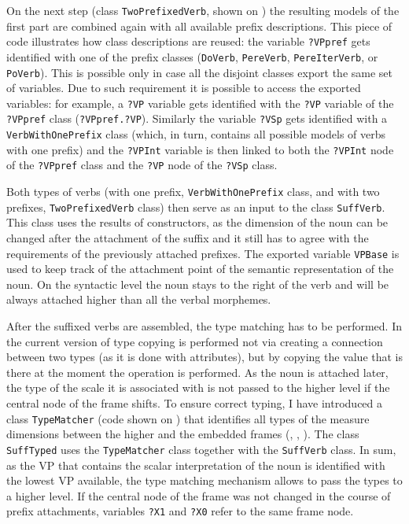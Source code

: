 On the next step (class \texttt{TwoPrefixedVerb}, shown on ) the resulting models of the first part are combined again with all available prefix descriptions. This piece of code illustrates how class descriptions are reused: the variable \texttt{?VPpref} gets identified with one of the prefix classes (\texttt{DoVerb}, \texttt{PereVerb}, \texttt{PereIterVerb}, or \texttt{PoVerb}). This is possible only in case all the disjoint classes export the same set of variables. Due to such requirement it is possible to access the exported variables: for example, a \texttt{?VP} variable gets identified with the \texttt{?VP} variable of the \texttt{?VPpref} class (\texttt{?VPpref.?VP}). Similarly the variable \texttt{?VSp} gets identified with a \texttt{VerbWithOnePrefix} class (which, in turn, contains all possible models of verbs with one prefix) and the \texttt{?VPInt} variable is then linked to both the \texttt{?VPInt} node of the \texttt{?VPpref} class and the \texttt{?VP} node of the \texttt{?VSp} class. 

Both types of verbs (with one prefix, \texttt{VerbWithOnePrefix} class, and with two prefixes, \texttt{TwoPrefixedVerb} class) then serve as an input to the class \texttt{SuffVerb}. This class uses the results of  constructors, as the dimension of the noun can be changed after the attachment of the suffix and it still has to agree with the requirements of the previously attached prefixes. The exported variable \texttt{VPBase} is used to keep track of the attachment point of the semantic representation of the noun. On the syntactic level the noun stays to the right of the verb and will be always attached higher than all the verbal morphemes. 

After the suffixed verbs are assembled, the type matching has to be performed. In the current version of  type copying is performed not via creating a connection between two types (as it is done with attributes), but by copying the value that is there at the moment the operation is performed. As the noun is attached later, the type of the scale it is associated with is not passed to the higher level if the central node of the frame shifts. To ensure correct typing, I have introduced a class \texttt{TypeMatcher} (code shown on ) that identifies all types of the measure dimensions between the higher and the embedded frames (\MDIM, \NOUNDIM, \VERBDIM). The class \texttt{SuffTyped} uses the \texttt{TypeMatcher} class together with the \texttt{SuffVerb} class. In sum, as the VP that contains the scalar interpretation of the noun is identified with the lowest VP available, the type matching mechanism allows to pass the types to a higher level. If the central node of the frame was not changed in the course of prefix attachments, variables \texttt{?X1} and \texttt{?X0} refer to the same frame node.

